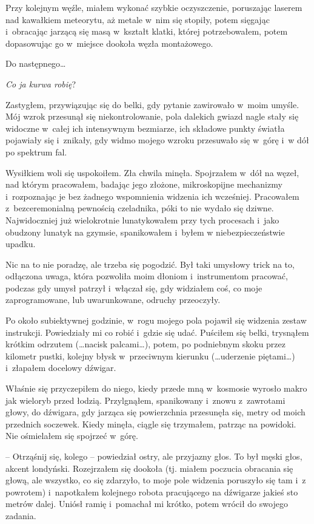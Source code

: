 \documentclass[oneside,polish,11pt,sfheadings]{mwbk}
\begin{document}
Przy kolejnym węźle, miałem wykonać szybkie oczyszczenie, poruszając
laserem nad kawałkiem meteorytu, aż metale w~nim się stopiły, potem
sięgając i~obracając jarzącą się masą w~kształt klatki, której
potrzebowałem, potem dopasowując go w~miejsce dookoła węzła montażowego.

Do następnego\ldots

\emph{Co ja kurwa robię}?

Zastygłem, przywiązując się do belki, gdy pytanie zawirowało w~moim
umyśle. Mój wzrok przesunął się niekontrolowanie, pola dalekich gwiazd
nagle stały się widoczne w~całej ich intensywnym bezmiarze, ich składowe
punkty światła pojawiały się i~znikały, gdy widmo mojego wzroku
przesuwało się w~górę i~w dół po spektrum fal.

Wysiłkiem woli się uspokoiłem. Zła chwila minęła. Spojrzałem w~dół na
węzeł, nad którym pracowałem, badając jego złożone, mikroskopijne
mechanizmy i~rozpoznając je bez żadnego wspomnienia widzenia ich
wcześniej. Pracowałem z~bezceremonialną pewnością czeladnika, póki to
nie wydało się dziwne. Najwidoczniej już wielokrotnie lunatykowałem przy
tych procesach i~jako obudzony lunatyk na gzymsie, spanikowałem i~byłem
w niebezpieczeństwie upadku.

Nic na to nie poradzę, ale trzeba się pogodzić. Był taki umysłowy trick
na to, odłączona uwaga, która pozwoliła moim dłoniom i~instrumentom
pracować, podczas gdy umysł patrzył i~włączał się, gdy widziałem coś, co
moje zaprogramowane, lub uwarunkowane, odruchy przeoczyły.

Po około subiektywnej godzinie, w~rogu mojego pola pojawił się widzenia
zestaw instrukcji. Powiedziały mi co robić i~gdzie się udać. Puściłem
się belki, trysnąłem krótkim odrzutem (\ldots nacisk palcami\ldots ), potem, po
podniebnym skoku przez kilometr pustki, kolejny błysk w~przeciwnym
kierunku (\ldots uderzenie piętami\ldots ) i~złapałem docelowy dźwigar.

Właśnie się przyczepiłem do niego, kiedy przede mną w~kosmosie wyrosło
makro jak wieloryb przed łodzią. Przylgnąłem, spanikowany i~znowu z~zawrotami głowy, do dźwigara, gdy jarząca się powierzchnia przesunęła
się, metry od moich przednich soczewek. Kiedy minęła, ciągle się
trzymałem, patrząc na powidoki. Nie ośmielałem się spojrzeć w~górę.

-- Otrząśnij się, kolego -- powiedział ostry, ale przyjazny głos. To był
męski głos, akcent londyński. Rozejrzałem się dookoła (tj. miałem
poczucia obracania się głową, ale wszystko, co się zdarzyło, to moje
pole widzenia poruszyło się tam i~z powrotem) i~napotkałem kolejnego
robota pracującego na dźwigarze jakieś sto metrów dalej. Uniósł ramię i~pomachał mi krótko, potem wrócił do swojego zadania.
\end{document}
